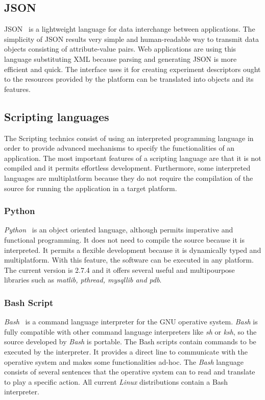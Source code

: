 \subsection{JSON}

\ac{JSON}~\cite{Organization} is a lightweight language for data interchange between applications. The
simplicity of \ac{JSON} results very simple and human-readable way to transmit data
objects consisting of attribute-value pairs. Web applications are using this
language substituting \ac{XML} because parsing and generating \ac{JSON} is more efficient
and quick. The \bonfire interface uses it for creating experiment descriptors
ought to the resources provided by the platform can be translated into objects
and its features.

\subsection{Scripting languages}

The Scripting technics consist of using an interpreted programming language in
order to provide advanced mechanisms to specify the functionalities of an
application. The most important features of a scripting language are that it is not
compiled and it permits effortless development. Furthermore, some interpreted languages
are multiplatform because they do not require the compilation of the source for
running the application in a target platform.


\subsubsection{Python}
\emph{Python}~\cite{Foundation2014} is an object oriented language, although permits imperative and functional
programming. It does not need to compile the source because it is
interpreted. It permits a flexible development because it is dynamically typed
and multiplatform. With this feature, the software can be
executed in any platform. The current version is 2.7.4 and it offers several
useful and multipourpose libraries such as \emph{matlib, pthread, mysqllib and pdb}.

\subsubsection{Bash Script}

\emph{Bash}~\cite{Cooper2014} is a command language interpreter for the \ac{GNU}
operative system. \emph{Bash} is fully compatible with other command language
interpreters like \emph{sh} or \emph{ksh}, so the source developed by
\emph{Bash} is portable. The Bash scripts contain
commands  to be executed by the interpreter. It provides a direct line
to communicate with the operative system and makes some functionalities ad-hoc.
The \emph{Bash} language consists of several sentences that the operative system
can to read and translate to play a specific action. All current \emph{Linux} distributions contain a Bash interpreter.

